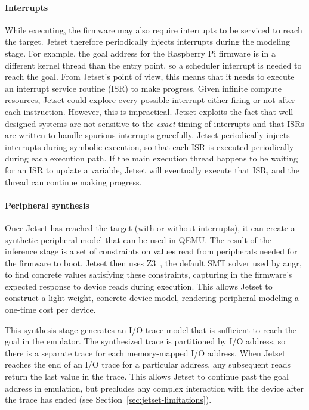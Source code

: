 \paragraph{Interrupts}
While executing, the firmware may also require interrupts to be serviced to reach the target.
Jetset therefore periodically injects interrupts during the modeling stage.
For example, the goal address for the Raspberry Pi firmware is in a different kernel thread than the entry point, so a scheduler interrupt is needed to reach the goal.
From Jetset's point of view, this means that it needs to execute an interrupt service routine (ISR) to make progress.
Given infinite compute resources, Jetset could explore every possible interrupt either firing or not after each instruction.
However, this is impractical.
Jetset exploits the fact that well-designed systems are not sensitive to the \emph{exact} timing of interrupts and that ISRs are written to handle spurious interrupts gracefully.
Jetset periodically injects interrupts during symbolic execution, so that each ISR is executed periodically during each execution path.
If the main execution thread happens to be waiting for an ISR to update a variable, Jetset will eventually execute that ISR, and the thread can continue making progress.

\paragraph{Peripheral synthesis}
Once Jetset has reached the target (with or without interrupts), it can create a synthetic peripheral model that can be used in QEMU.
The result of the inference stage is a set of constraints on values read from peripherals needed for the firmware to boot.
Jetset then uses Z3~\cite{zthree}, the default SMT solver used by angr, to find concrete values satisfying these constraints, capturing in the firmware's expected response to device reads during execution.
This allows Jetset to construct a light-weight, concrete device model, rendering peripheral modeling a one-time cost per device.

This synthesis stage generates an I/O trace model that is sufficient to reach the goal in the emulator.
The synthesized trace is partitioned by I/O address, so there is a separate trace for each memory-mapped I/O address.
When Jetset reaches the end of an I/O trace for a particular address, any subsequent reads return the last value in the trace.
This allows Jetset to continue past the goal address in emulation, but precludes any complex interaction with the device after the trace has ended (see Section~\ref{sec:jetset-limitations}).

